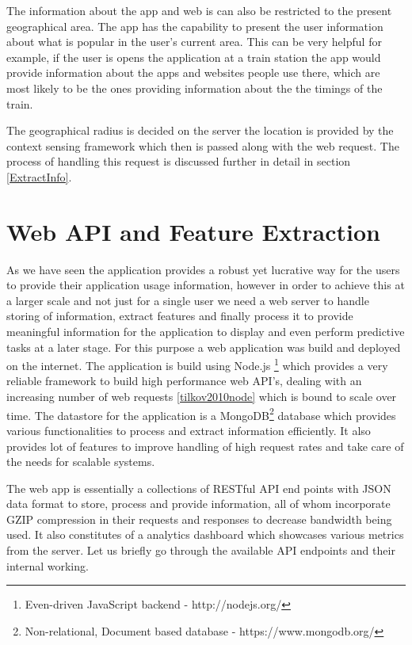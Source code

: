 \documentclass[12pt]{report}
\begin{document}
The information about the app and web is can also be restricted to the present geographical area. The app has the capability to present the user information about what is popular in the user's current area. This can be very helpful for example, if the user is opens the application at a train station the app would provide information about the apps and websites people use there, which are most likely to be the ones providing information about the the timings of the train.

The geographical radius is decided on the server the location is provided by the context sensing framework which then is passed along with the web request. The process of handling this request is discussed further in detail in section \ref{ExtractInfo}.

\section{Web API and Feature Extraction}

As we have seen the application provides a robust yet lucrative way for the users to provide their application usage information, however in order to achieve this at a larger scale and not just for a single user we need a web server to handle storing of information, extract features and finally process it to provide meaningful information for the application to display and even perform predictive tasks at a later stage. For this purpose a web application was build and deployed on the internet. The application is build using Node.js \footnote{Even-driven JavaScript backend - http://nodejs.org/} which provides a very reliable framework to build high performance web API's,  dealing with an increasing number of web requests \ref{tilkov2010node} which is bound to scale over time. The datastore for the application is a MongoDB\footnote{Non-relational, Document based database - https://www.mongodb.org/} database which provides various functionalities to process and extract information efficiently. It also provides lot of features to improve handling of high request rates and take care of the needs for scalable systems.

The web app is essentially a collections of RESTful API end points with JSON data format to store, process and provide information, all of whom incorporate GZIP compression in their requests and responses to decrease bandwidth being used. It also constitutes of a analytics dashboard which showcases various metrics from the server. Let us briefly go through the available API endpoints and their internal working.
\end{document}
